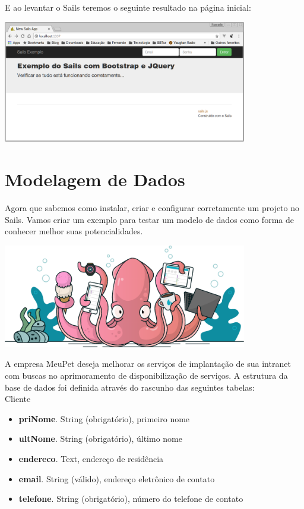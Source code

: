 \documentclass[a4paper,11pt]{article}
\begin{document}
E ao levantar o Sails teremos o seguinte resultado na página inicial:
\begin{center} 
\includegraphics[width=0.8\textwidth]{sailsEx01.png}
\end{center}

\section{Modelagem de Dados}
Agora que sabemos como instalar, criar e configurar corretamente um projeto no
Sails. Vamos criar um exemplo para testar um modelo de dados como forma de conhecer melhor suas potencialidades.
\begin{center} 
\includegraphics[width=0.8\textwidth]{hero_squid.png} 
\end{center}
A empresa MeuPet deseja melhorar os serviços de implantação de sua intranet 
com buscas no aprimoramento de disponibilização de serviços. A estrutura da 
base de dados foi definida através do rascunho das seguintes tabelas: \\[3mm]
{\ttfamily Cliente}
\begin{itemize}
  \item \textbf{priNome}. String (obrigatório), primeiro nome
  \item \textbf{ultNome}. String (obrigatório), último nome
  \item \textbf{endereco}.  Text, endereço de residência
  \item \textbf{email}. String (válido), endereço eletrônico de contato
  \item \textbf{telefone}. String (obrigatório), número do telefone de contato
\end{itemize}
\end{document}
